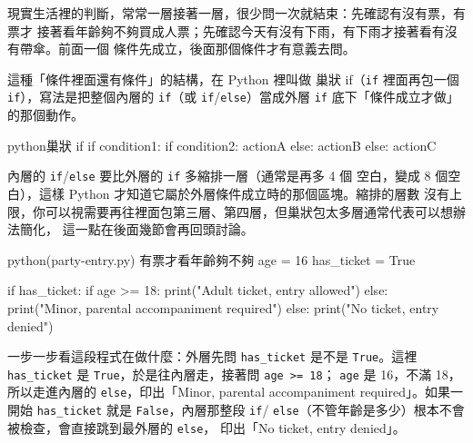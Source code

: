 現實生活裡的判斷，常常一層接著一層，很少問一次就結束：先確認有沒有票，有票才
接著看年齡夠不夠買成人票；先確認今天有沒有下雨，有下雨才接著看有沒有帶傘。前面一個
條件先成立，後面那個條件才有意義去問。

這種「條件裡面還有條件」的結構，在 Python 裡叫做
巢狀 if（\texttt{if} 裡面再包一個 \texttt{if}），寫法是把整個內層的 \texttt{if}（或
\texttt{if}/\texttt{else}）當成外層 \texttt{if} 底下「條件成立才做」的那個動作。

\begin{code}{python}{巢狀 if}
if condition1:
    if condition2:
        actionA
    else:
        actionB
else:
    actionC
\end{code}

內層的 \texttt{if}/\texttt{else} 要比外層的 \texttt{if} 多縮排一層（通常是再多 4 個
空白，變成 8 個空白），這樣 Python 才知道它屬於外層條件成立時的那個區塊。縮排的層數
沒有上限，你可以視需要再往裡面包第三層、第四層，但巢狀包太多層通常代表可以想辦法簡化，
這一點在後面幾節會再回頭討論。

\begin{example}{python}{(party-entry.py) 有票才看年齡夠不夠}
age = 16
has_ticket = True

if has_ticket:
    if age >= 18:
        print("Adult ticket, entry allowed")
    else:
        print("Minor, parental accompaniment required")
else:
    print("No ticket, entry denied")
\end{example}


一步一步看這段程式在做什麼：外層先問 \texttt{has\_ticket} 是不是 \texttt{True}。這裡
\texttt{has\_ticket} 是 \texttt{True}，於是往內層走，接著問 \texttt{age >= 18}；
\texttt{age} 是 16，不滿 18，所以走進內層的 \texttt{else}，印出「Minor, parental
accompaniment required」。如果一開始 \texttt{has\_ticket} 就是 \texttt{False}，內層那整段 \texttt{if}/
\texttt{else}（不管年齡是多少）根本不會被檢查，會直接跳到最外層的 \texttt{else}，
印出「No ticket, entry denied」。


